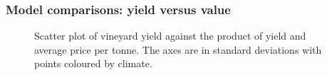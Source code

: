 \documentclass[review,12pt,authoryear]{elsarticle}
\begin{document}
\begin{linenumbers}
\subsubsection{Model comparisons: yield versus value}
%
\begin{figure}
  \caption{Scatter plot of vineyard yield against the product of yield and average price per tonne. The axes are in standard deviations with points coloured by climate.}\label{fig:yield_vs_value}
\end{figure}
%
\begin{figure}

\end{figure}
\end{linenumbers}
\end{document}
